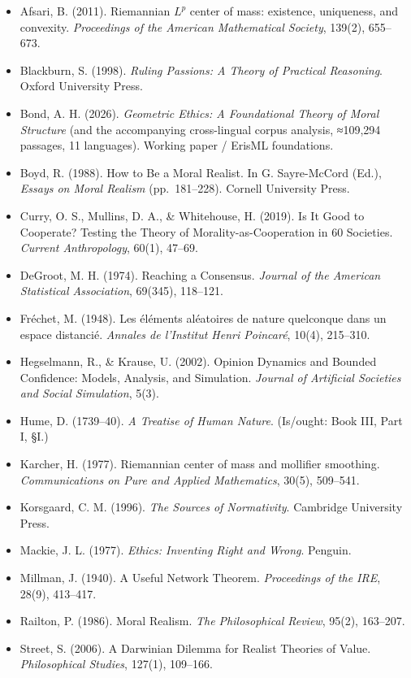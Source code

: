 \documentclass[
]{article}
\providecommand{\tightlist}{%
  \setlength{\itemsep}{0pt}\setlength{\parskip}{0pt}}
\begin{document}
\begin{itemize}
\tightlist
\item
  Afsari, B. (2011). Riemannian \(L^p\) center of mass: existence,
  uniqueness, and convexity. \emph{Proceedings of the American
  Mathematical Society}, 139(2), 655--673.
\item
  Blackburn, S. (1998). \emph{Ruling Passions: A Theory of Practical
  Reasoning}. Oxford University Press.
\item
  Bond, A. H. (2026). \emph{Geometric Ethics: A Foundational Theory of
  Moral Structure} (and the accompanying cross-lingual corpus analysis,
  ≈109,294 passages, 11 languages). Working paper / ErisML foundations.
\item
  Boyd, R. (1988). How to Be a Moral Realist. In G. Sayre-McCord (Ed.),
  \emph{Essays on Moral Realism} (pp.~181--228). Cornell University
  Press.
\item
  Curry, O. S., Mullins, D. A., \& Whitehouse, H. (2019). Is It Good to
  Cooperate? Testing the Theory of Morality-as-Cooperation in 60
  Societies. \emph{Current Anthropology}, 60(1), 47--69.
\item
  DeGroot, M. H. (1974). Reaching a Consensus. \emph{Journal of the
  American Statistical Association}, 69(345), 118--121.
\item
  Fréchet, M. (1948). Les éléments aléatoires de nature quelconque dans
  un espace distancié. \emph{Annales de l'Institut Henri Poincaré},
  10(4), 215--310.
\item
  Hegselmann, R., \& Krause, U. (2002). Opinion Dynamics and Bounded
  Confidence: Models, Analysis, and Simulation. \emph{Journal of
  Artificial Societies and Social Simulation}, 5(3).
\item
  Hume, D. (1739--40). \emph{A Treatise of Human Nature}. (Is/ought:
  Book III, Part I, §I.)
\item
  Karcher, H. (1977). Riemannian center of mass and mollifier smoothing.
  \emph{Communications on Pure and Applied Mathematics}, 30(5),
  509--541.
\item
  Korsgaard, C. M. (1996). \emph{The Sources of Normativity}. Cambridge
  University Press.
\item
  Mackie, J. L. (1977). \emph{Ethics: Inventing Right and Wrong}.
  Penguin.
\item
  Millman, J. (1940). A Useful Network Theorem. \emph{Proceedings of the
  IRE}, 28(9), 413--417.
\item
  Railton, P. (1986). Moral Realism. \emph{The Philosophical Review},
  95(2), 163--207.
\item
  Street, S. (2006). A Darwinian Dilemma for Realist Theories of Value.
  \emph{Philosophical Studies}, 127(1), 109--166.
\end{itemize}
\end{document}
